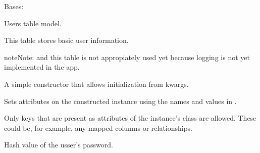 \documentclass[a4paper,landscape,10pt,english]{sphinxmanual}
\begin{document}
\begin{fulllineitems}
\label{\detokenize{code_docs/simulation_API.model:simulation_API.model.models.UserDB}}
Bases: 

Users table model.

This table stores basic user information.

\begin{sphinxadmonition}{note}{Note:}
{\hyperref[\detokenize{code_docs/simulation_API.model:simulation_API.model.models.UserDB.hash_value}]{}} and this  table is not
appropiately used yet because logging is not yet implemented in the app.
\end{sphinxadmonition}

\begin{fulllineitems}
\label{\detokenize{code_docs/simulation_API.model:simulation_API.model.models.UserDB.__init__}}
A simple constructor that allows initialization from kwargs.

Sets attributes on the constructed instance using the names and
values in .

Only keys that are present as
attributes of the instance’s class are allowed. These could be,
for example, any mapped columns or relationships.

\end{fulllineitems}


\begin{fulllineitems}
\label{\detokenize{code_docs/simulation_API.model:simulation_API.model.models.UserDB.hash_value}}
Hash value of the usser’s password.

\end{fulllineitems}


\end{fulllineitems}
\end{document}
